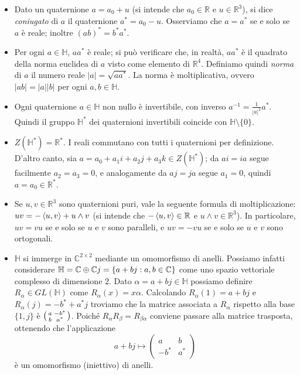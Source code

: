\begin{itemize}
\item Dato un quaternione $a=a_0+u$ (si intende che $a_0\in\mathbb{R}$ e $u\in\mathbb{R}^3$), si dice \emph{coniugato} di $a$ il quaternione $a^*=a_0-u$. Osserviamo che $a=a^*$ se e solo se $a$ è reale; inoltre $(ab)^*=b^*a^*$.
\item Per ogni $a\in\mathbb{H}$, $aa^*$ è reale; si può verificare che, in realtà, $aa^*$ è il quadrato della norma euclidea di $a$ visto come elemento di $\mathbb{R}^4$. Definiamo quindi \emph{norma} di $a$ il numero reale $|a|=\sqrt{aa^*}$. La norma è moltiplicativa, ovvero $|ab|=|a||b|$ per ogni $a,b\in\mathbb{H}$.
\item Ogni quaternione $a\in\mathbb{H}$ non nullo è invertibile, con inverso $a^{-1}=\frac{1}{|a|^2}a^*$. Quindi il gruppo $\mathbb{H}^*$ dei quaternioni invertibili coincide con $\mathbb{H}\setminus\{0\}$.
\item $Z(\mathbb{H}^*)=\mathbb{R}^*$. I reali commutano con tutti i quaternioni per definizione. D'altro canto, sia $a=a_0+a_1i+a_2j+a_3k\in Z(\mathbb{H}^*)$; da $ai=ia$ segue facilmente $a_2=a_3=0$, e analogamente da $aj=ja$ segue $a_1=0$, quindi $a=a_0\in\mathbb{R}^*$.
\item Se $u,v\in\mathbb{R}^3$ sono quaternioni puri, vale la seguente formula di moltiplicazione: $uv=-\left\langle u,v\right\rangle+u\wedge v$ (si intende che $-\left\langle u,v\right\rangle\in\mathbb{R}$ e $u\wedge v\in\mathbb{R}^3$). In particolare, $uv=vu$ se e solo se $u$ e $v$ sono paralleli, e $uv=-vu$ se e solo se $u$ e $v$ sono ortogonali.
\item $\mathbb{H}$ si immerge in $\mathbb{C}^{2\times 2}$ mediante un omomorfismo di anelli. Possiamo infatti considerare $\mathbb{H}=\mathbb{C}\oplus\mathbb{C}j=\{a+bj:a,b\in\mathbb{C}\}$ come uno spazio vettoriale complesso di dimensione $2$. Dato $\alpha=a+bj\in\mathbb{H}$ possiamo definire $R_\alpha\in GL(\mathbb{H})$ come $R_\alpha(x)=x\alpha$. Calcolando $R_\alpha(1)=a+bj$ e $R_\alpha(j)=-b^*+a^*j$ troviamo che la matrice associata a $R_\alpha$ rispetto alla base $\{1,j\}$ è $\begin{psmallmatrix}a&-b^*\\b&a^*\end{psmallmatrix}$. Poiché $R_\alpha R_\beta=R_{\beta\alpha}$ conviene passare alla matrice trasposta, ottenendo che l'applicazione
$$
a+bj\longmapsto\begin{pmatrix}a&b\\-b^*&a^*\end{pmatrix}
$$
è un omomorfismo (iniettivo) di anelli.

\end{itemize}

